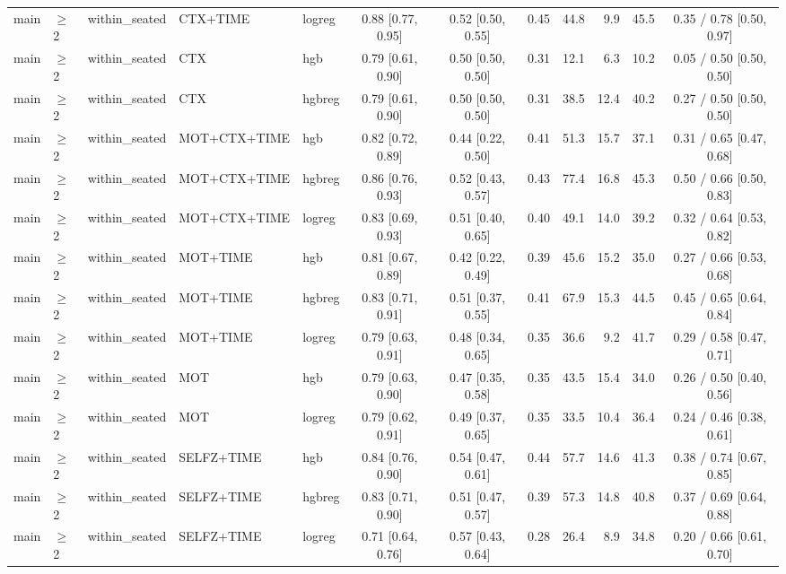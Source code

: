 \begin{longtable}{@{}lllllcccrrrc@{}}
main & $\geq$2 & within\_seated & CTX+TIME & logreg & 0.88 [0.77, 0.95] & 0.52 [0.50, 0.55] & 0.45 & 44.8 & 9.9 & 45.5 & 0.35 / 0.78 [0.50, 0.97] \\
main & $\geq$2 & within\_seated & CTX & hgb & 0.79 [0.61, 0.90] & 0.50 [0.50, 0.50] & 0.31 & 12.1 & 6.3 & 10.2 & 0.05 / 0.50 [0.50, 0.50] \\
main & $\geq$2 & within\_seated & CTX & hgbreg & 0.79 [0.61, 0.90] & 0.50 [0.50, 0.50] & 0.31 & 38.5 & 12.4 & 40.2 & 0.27 / 0.50 [0.50, 0.50] \\
main & $\geq$2 & within\_seated & MOT+CTX+TIME & hgb & 0.82 [0.72, 0.89] & 0.44 [0.22, 0.50] & 0.41 & 51.3 & 15.7 & 37.1 & 0.31 / 0.65 [0.47, 0.68] \\
main & $\geq$2 & within\_seated & MOT+CTX+TIME & hgbreg & 0.86 [0.76, 0.93] & 0.52 [0.43, 0.57] & 0.43 & 77.4 & 16.8 & 45.3 & 0.50 / 0.66 [0.50, 0.83] \\
main & $\geq$2 & within\_seated & MOT+CTX+TIME & logreg & 0.83 [0.69, 0.93] & 0.51 [0.40, 0.65] & 0.40 & 49.1 & 14.0 & 39.2 & 0.32 / 0.64 [0.53, 0.82] \\
main & $\geq$2 & within\_seated & MOT+TIME & hgb & 0.81 [0.67, 0.89] & 0.42 [0.22, 0.49] & 0.39 & 45.6 & 15.2 & 35.0 & 0.27 / 0.66 [0.53, 0.68] \\
main & $\geq$2 & within\_seated & MOT+TIME & hgbreg & 0.83 [0.71, 0.91] & 0.51 [0.37, 0.55] & 0.41 & 67.9 & 15.3 & 44.5 & 0.45 / 0.65 [0.64, 0.84] \\
main & $\geq$2 & within\_seated & MOT+TIME & logreg & 0.79 [0.63, 0.91] & 0.48 [0.34, 0.65] & 0.35 & 36.6 & 9.2 & 41.7 & 0.29 / 0.58 [0.47, 0.71] \\
main & $\geq$2 & within\_seated & MOT & hgb & 0.79 [0.63, 0.90] & 0.47 [0.35, 0.58] & 0.35 & 43.5 & 15.4 & 34.0 & 0.26 / 0.50 [0.40, 0.56] \\
main & $\geq$2 & within\_seated & MOT & logreg & 0.79 [0.62, 0.91] & 0.49 [0.37, 0.65] & 0.35 & 33.5 & 10.4 & 36.4 & 0.24 / 0.46 [0.38, 0.61] \\
main & $\geq$2 & within\_seated & SELFZ+TIME & hgb & 0.84 [0.76, 0.90] & 0.54 [0.47, 0.61] & 0.44 & 57.7 & 14.6 & 41.3 & 0.38 / 0.74 [0.67, 0.85] \\
main & $\geq$2 & within\_seated & SELFZ+TIME & hgbreg & 0.83 [0.71, 0.90] & 0.51 [0.47, 0.57] & 0.39 & 57.3 & 14.8 & 40.8 & 0.37 / 0.69 [0.64, 0.88] \\
main & $\geq$2 & within\_seated & SELFZ+TIME & logreg & 0.71 [0.64, 0.76] & 0.57 [0.43, 0.64] & 0.28 & 26.4 & 8.9 & 34.8 & 0.20 / 0.66 [0.61, 0.70] \\

\end{longtable}
